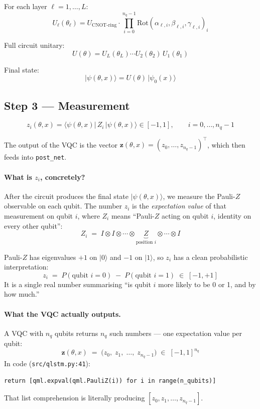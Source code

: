 \documentclass[11pt,a4paper]{article}
\begin{document}
For each layer $\ell = 1, \dots, L$:
\[
  U_\ell(\theta_\ell) = U_{\text{CNOT-ring}} \cdot \prod_{i=0}^{n_q-1} \mathrm{Rot}(\alpha_{\ell,i}, \beta_{\ell,i}, \gamma_{\ell,i})_i
\]

Full circuit unitary:
\[
  U(\theta) = U_L(\theta_L) \cdots U_2(\theta_2) \, U_1(\theta_1)
\]

Final state:
\[
  |\psi(\theta, x)\rangle = U(\theta)\,|\psi_0(x)\rangle
\]

\subsection{Step 3 --- Measurement}

\[
  z_i(\theta, x) = \langle\psi(\theta, x)|\, Z_i \,|\psi(\theta, x)\rangle \in [-1, 1], \qquad i = 0, \dots, n_q - 1
\]

The output of the VQC is the vector $\mathbf{z}(\theta, x) = (z_0, \dots, z_{n_q-1})^\top$, which then feeds into \texttt{post\_net}.

\paragraph{What is $z_i$, concretely?} After the circuit produces the final state $|\psi(\theta, x)\rangle$, we measure the Pauli-$Z$ observable on each qubit. The number $z_i$ is the \emph{expectation value} of that measurement on qubit $i$, where $Z_i$ means ``Pauli-$Z$ acting on qubit $i$, identity on every other qubit'':
\[
  Z_i \;=\; I \otimes I \otimes \cdots \otimes \underbrace{Z}_{\text{position } i} \otimes \cdots \otimes I
\]

Pauli-$Z$ has eigenvalues $+1$ on $|0\rangle$ and $-1$ on $|1\rangle$, so $z_i$ has a clean probabilistic interpretation:
\[
  z_i \;=\; P(\text{qubit } i = 0) \;-\; P(\text{qubit } i = 1) \;\in\; [-1, +1]
\]
It is a single real number summarising ``is qubit $i$ more likely to be 0 or 1, and by how much.''

\paragraph{What the VQC actually outputs.} A VQC with $n_q$ qubits returns $n_q$ such numbers --- one expectation value per qubit:
\[
  \mathbf{z}(\theta, x) \;=\; \bigl(z_0,\; z_1,\; \dots,\; z_{n_q-1}\bigr) \;\in\; [-1, 1]^{n_q}
\]
In code (\texttt{src/qlstm.py:41}):
\begin{lstlisting}
return [qml.expval(qml.PauliZ(i)) for i in range(n_qubits)]
\end{lstlisting}
That list comprehension is literally producing $[z_0, z_1, \dots, z_{n_q-1}]$.
\end{document}

